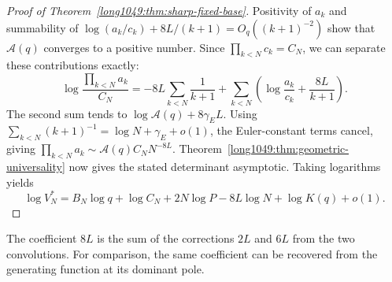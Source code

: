 \documentclass[11pt]{article}
\begin{document}
\begin{proof}[Proof of Theorem~\ref{long1049:thm:sharp-fixed-base}]
Positivity of $a_k$ and summability of
$\log(a_k/c_k)+8L/(k+1)=O_q((k+1)^{-2})$
show that $\mathcal A(q)$ converges to a positive number.
Since $\prod_{k<N}c_k=C_N$, we can separate these contributions exactly:
\[
 \log\frac{\prod_{k<N}a_k}{C_N}
 =-8L\sum_{k<N}\frac1{k+1}
  +\sum_{k<N}\left(\log\frac{a_k}{c_k}+\frac{8L}{k+1}\right).
\]
The second sum tends to $\log\mathcal A(q)+8\gamma_{\!E}L$.
Using $\sum_{k<N}(k+1)^{-1}=\log N+\gamma_{\!E}+o(1)$,
the Euler-constant terms cancel, giving
$\prod_{k<N}a_k\sim\mathcal A(q)C_NN^{-8L}$.
Theorem~\ref{long1049:thm:geometric-universality} now gives the
stated determinant asymptotic. Taking logarithms yields
\[
 \log V_N^*=B_N\log q+\log C_N+2N\log P
             -8L\log N+\log K(q)+o(1).
\]
\end{proof}

The coefficient $8L$ is the sum of the corrections $2L$ and $6L$
from the two convolutions. For comparison, the same coefficient can
be recovered from the generating function at its dominant pole.
\end{document}

